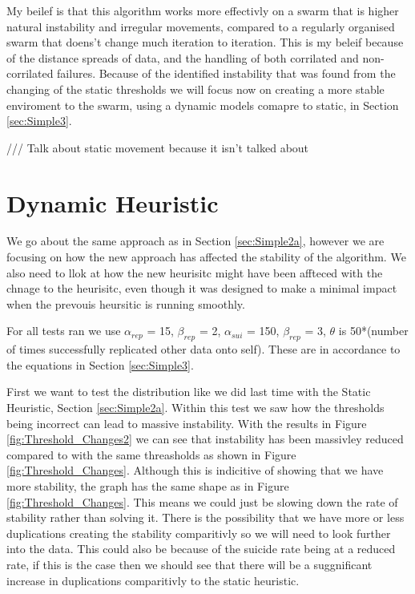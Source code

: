 \documentclass{UoYCSproject}
\begin{document}
My beilef is that this algorithm works more effectivly on a swarm that is higher natural instability and irregular movements, compared to a regularly organised swarm that doens't change much iteration to iteration.
This is my beleif because of the distance spreads of data, and the handling of both corrilated and non-corrilated failures.
Because of the identified instability that was found from the changing of the static thresholds we will focus now on creating a more stable enviroment to the swarm, using a dynamic models comapre to static, in Section \ref{sec:Simple3}.


/// Talk about static movement because it isn't talked about

\section{Dynamic Heuristic}
\label{sec:Simple3a}

We go about the same approach as in Section \ref{sec:Simple2a}, however we are focusing on how the new approach has affected the stability of the algorithm.
We also need to llok at how the new heurisitc might have been affteced with the chnage to the heurisitc, even though it was designed to make a minimal impact when the prevouis heursitic is running smoothly.

For all tests ran we use $\alpha_{rep}$ = 15, $\beta_{rep}$ = 2, $\alpha_{sui}$ = 150, $\beta_{rep}$ = 3, $\theta$ is 50*(number of times successfully replicated other data onto self).
These are in accordance to the equations in Section \ref{sec:Simple3}.

First we want to test the distribution like we did last time with the Static Heuristic, Section \ref{sec:Simple2a}.
Within this test we saw how the thresholds being incorrect can lead to massive instability.
With the results in Figure \ref{fig:Threshold_Changes2} we can see that instability has been massivley reduced compared to with the same threasholds as shown in Figure \ref{fig:Threshold_Changes}.
Although this is indicitive of showing that we have more stability, the graph has the same shape as in Figure \ref{fig:Threshold_Changes}.
This means we could just be slowing down the rate of stability rather than solving it.
There is the possibility that we have more or less duplications creating the stability comparitivly so we will need to look further into the data.
This could also be because of the suicide rate being at a reduced rate, if this is the case then we should see that there will be a suggnificant increase in duplications comparitivly to the static heuristic.
\end{document}
